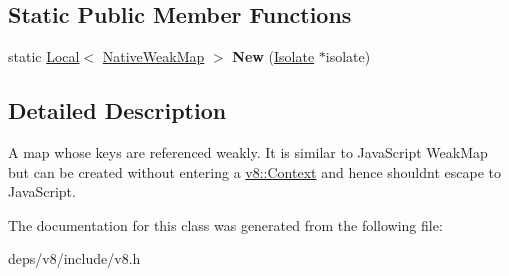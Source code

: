 \subsection*{Static Public Member Functions}
\begin{DoxyCompactItemize}
\item 
\hypertarget{classv8_1_1_native_weak_map_afeb513d14fbb8d4537e4a051c71fbf31}{}static \hyperlink{classv8_1_1_local}{Local}$<$ \hyperlink{classv8_1_1_native_weak_map}{Native\+Weak\+Map} $>$ {\bfseries New} (\hyperlink{classv8_1_1_isolate}{Isolate} $\ast$isolate)\label{classv8_1_1_native_weak_map_afeb513d14fbb8d4537e4a051c71fbf31}

\end{DoxyCompactItemize}


\subsection{Detailed Description}
A map whose keys are referenced weakly. It is similar to Java\+Script Weak\+Map but can be created without entering a \hyperlink{classv8_1_1_context}{v8\+::\+Context} and hence shouldn\textquotesingle{}t escape to Java\+Script. 

The documentation for this class was generated from the following file\+:\begin{DoxyCompactItemize}
\item 
deps/v8/include/v8.\+h\end{DoxyCompactItemize}
